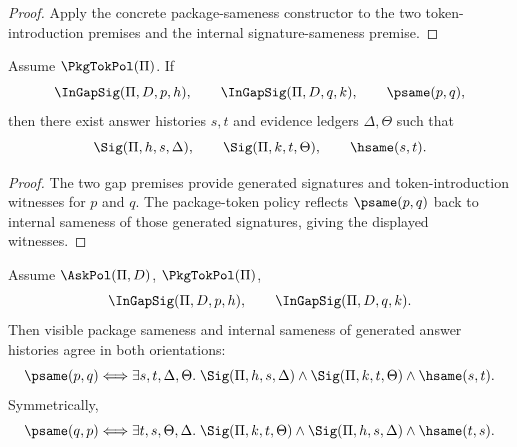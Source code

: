 \begin{proof}
Apply the concrete package-sameness constructor to the two token-introduction premises and the internal signature-sameness premise.
\end{proof}

\begin{theorem}
\label{thm:globalize-completeness}
\label{thm:concrete-globalization-completeness-samesig}
\label{thm:concrete-globalize-completeness}
Assume $\PkgTokPol(\Pi)$. If
$$
  \InGapSig(\Pi,D,p,h),
  \qquad
  \InGapSig(\Pi,D,q,k),
  \qquad
  \psame(p,q),
$$
then there exist answer histories $s,t$ and evidence ledgers $\Delta,\Theta$ such that
$$
  \Sig(\Pi,h,s,\Delta),
  \qquad
  \Sig(\Pi,k,t,\Theta),
  \qquad
  \hsame(s,t).
$$
\end{theorem}

\begin{proof}
The two gap premises provide generated signatures and token-introduction witnesses for $p$ and $q$. The package-token policy reflects $\psame(p,q)$ back to internal sameness of those generated signatures, giving the displayed witnesses.
\end{proof}

\begin{corollary}
\label{cor:concrete-globalize-classifies-by-signatures}
Assume $\AskPol(\Pi,D)$, $\PkgTokPol(\Pi)$,
$$
  \InGapSig(\Pi,D,p,h),
  \qquad
  \InGapSig(\Pi,D,q,k).
$$
Then visible package sameness and internal sameness of generated answer histories agree in both orientations:
$$
  \psame(p,q)
  \Longleftrightarrow
  \exists s,t,\Delta,\Theta.\;
  \Sig(\Pi,h,s,\Delta)
  \wedge
  \Sig(\Pi,k,t,\Theta)
  \wedge
  \hsame(s,t).
$$
Symmetrically,
$$
  \psame(q,p)
  \Longleftrightarrow
  \exists t,s,\Theta,\Delta.\;
  \Sig(\Pi,k,t,\Theta)
  \wedge
  \Sig(\Pi,h,s,\Delta)
  \wedge
  \hsame(t,s).
$$
\end{corollary}

